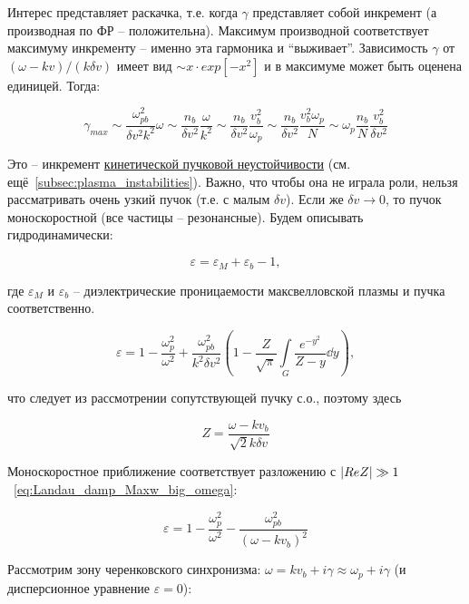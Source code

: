 \documentclass[10pt, a4paper]{article}
\begin{document}
Интерес представляет раскачка, т.е. когда $\gamma$ представляет собой инкремент (а производная по ФР -- положительна). Максимум производной соответствует максимуму инкременту -- именно эта гармоника и ``выживает''.
Зависимость $\gamma$ от $(\omega-kv)/(k\delta v)$ имеет вид $\sim x\cdot exp[-x^2]$ и в максимуме может быть оценена единицей. Тогда:

\begin{equation*}
	\gamma_{max} \sim \frac{\omega_{pb}^2}{\delta v^2k^2}\omega\sim \frac{n_b}{\delta v^2}\frac{\omega}{k^2}\sim\frac{n_b}{\delta v^2}\frac{v_b^2}{\omega_p}\sim\frac{n_b}{\delta v^2}\frac{v_b^2\omega_p}{N} \sim \omega_p\frac{n_b}{N}\frac{v_b^2}{\delta v^2}
\end{equation*}

Это -- инкремент \uline{кинетической пучковой неустойчивости} (см. ещё~\ref{subsec:plasma_instabilities}). Важно, что чтобы она не играла роли, нельзя рассматривать очень узкий пучок (т.е. с малым $\delta v$). Если же $\delta v\rightarrow 0$, то пучок моноскоростной (все частицы -- резонансные). Будем описывать гидродинамически:

\begin{equation*}
	\varepsilon = \varepsilon_M + \varepsilon_b - 1,
\end{equation*}

где $\varepsilon_M$ и $\varepsilon_b$ -- диэлектрические проницаемости максвелловской плазмы и пучка соответственно.

\begin{equation*}
	\varepsilon = 1 - \frac{\omega_p^2}{\omega^2} + \frac{\omega_{pb}^2}{k^2\delta v^2}\left(1-\frac{Z}{\sqrt{\pi}} \int\limits_G \frac{e^{-y^2}}{Z-y}\dd{y}\right),
\end{equation*}

что следует из рассмотрении сопутствующей пучку с.о., поэтому здесь

\begin{equation*}
	Z = \frac{\omega-kv_b}{\sqrt{2}k\delta v}
\end{equation*}

Моноскоростное приближение соответствует разложению с $\abs{ReZ}\gg 1$~\eqref{eq:Landau_damp_Maxw_big_omega}:

\begin{equation*}
	\varepsilon = 1 - \frac{\omega_p^2}{\omega^2} - \frac{\omega_{pb}^2}{(\omega-kv_b)^2}
\end{equation*}

Рассмотрим зону черенковского синхронизма: $\omega = kv_b+i\gamma\approx \omega_p+i\gamma$ (и дисперсионное уравнение $\varepsilon = 0$):
\end{document}
